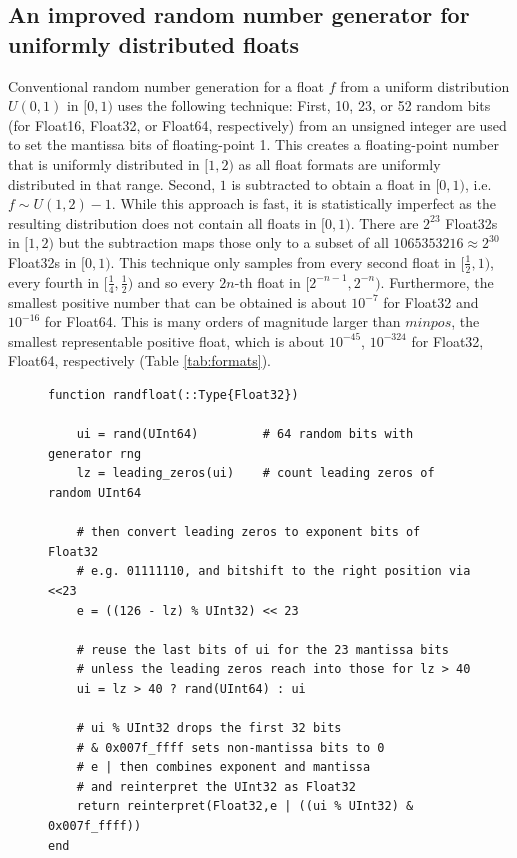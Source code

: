 \subsection{An improved random number generator for uniformly distributed floats}
\label{sec:randfloat}

Conventional random number generation for a float $f$ from a uniform distribution $U(0,1)$
in $[0,1)$ uses the following technique: First, 10, 23, or 52 random bits (for Float16, Float32, or Float64, respectively)
from an unsigned integer are used to set the mantissa bits of floating-point 1. This creates a floating-point
number that is uniformly distributed in $[1,2)$ as all float formats are uniformly distributed in that range. Second,
$1$ is subtracted to obtain a float in $[0,1)$, i.e. $f \sim U(1,2) - 1$. While this approach is fast, it is statistically
imperfect as the resulting distribution does not contain all floats in $[0,1)$. There are $2^{23}$ Float32s in $[1,2)$
but the subtraction maps those only to a subset of all $1065353216 \approx 2^{30}$ Float32s in $[0,1)$.
This technique only samples from every second float in $[\tfrac{1}{2},1)$, every fourth in
$[\tfrac{1}{4},\tfrac{1}{2})$ and so every $2n$-th float in $[2^{-n-1},2^{-n})$. Furthermore, the smallest positive
number that can be obtained is about $10^{-7}$ for Float32 and $10^{-16}$ for Float64. This is many orders of
magnitude larger than $minpos$, the smallest representable positive float, which is about $10^{-45}$, $10^{-324}$
for Float32, Float64, respectively (Table \ref{tab:formats}).

\begin{figure}[tbhp]
\begin{lstlisting}[language=JuliaLocal,label=lst:randfloat,caption={\textbf{An improved random number generator (RNG) for uniformly
distributed floats.} The Julia function \texttt{randfloat} takes a number format as argument (here only the version for Float32 is presented).
\texttt{\%} is the remainder after division, for unsigned integers effectively converting between unsigned integers by adding leading
zeros or discarding leading bits. \texttt{?} indicates a one-line if-clause. \texttt{\&} is the bitwise logical and-operation. \texttt{$\vert$}
is the bitwise logical or-operation.}]
function randfloat(::Type{Float32})

    ui = rand(UInt64)         # 64 random bits with generator rng
    lz = leading_zeros(ui)    # count leading zeros of random UInt64

    # then convert leading zeros to exponent bits of Float32
    # e.g. 01111110, and bitshift to the right position via <<23
    e = ((126 - lz) % UInt32) << 23

    # reuse the last bits of ui for the 23 mantissa bits
    # unless the leading zeros reach into those for lz > 40
    ui = lz > 40 ? rand(UInt64) : ui

    # ui % UInt32 drops the first 32 bits
    # & 0x007f_ffff sets non-mantissa bits to 0
    # e | then combines exponent and mantissa
    # and reinterpret the UInt32 as Float32
    return reinterpret(Float32,e | ((ui % UInt32) & 0x007f_ffff))
end
\end{lstlisting}
\end{figure}


